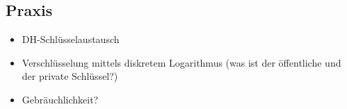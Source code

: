 \documentclass[
  a4paper,
  11pt,
]{article}
\begin{document}
\subsection*{Praxis}
\label{sub:Praxis}

\begin{itemize}
  \item DH-Schlüsselaustausch
  \item Verschlüsselung mittels diskretem Logarithmus (was ist der öffentliche
    und der private Schlüssel?)
  \item Gebräuchlichkeit?
\end{itemize}
\end{document}
